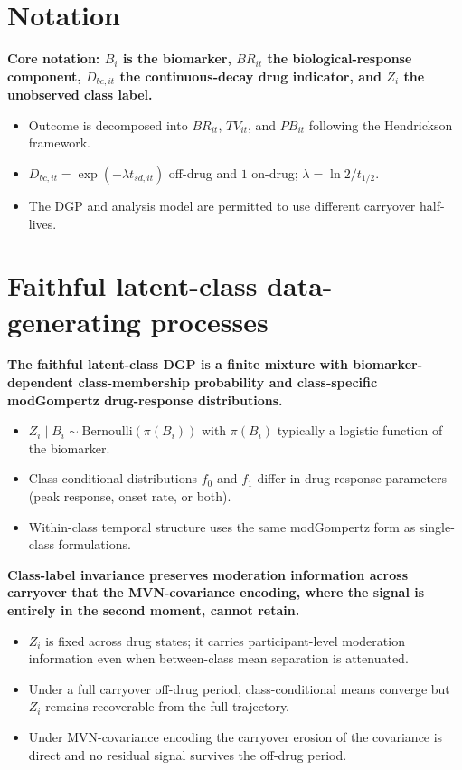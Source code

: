 \documentclass[
  11pt,
]{article}
\begin{document}
\section{Notation}\label{notation}

\textbf{Core notation: $B_i$ is the biomarker, $BR_{it}$ the
biological-response component, $D_{bc,it}$ the continuous-decay drug
indicator, and $Z_i$ the unobserved class label.}

\begin{itemize}\setlength{\itemsep}{2pt}\setlength{\parskip}{0pt}
\item Outcome is decomposed into $BR_{it}$, $TV_{it}$, and $PB_{it}$
  following the Hendrickson framework.
\item $D_{bc,it} = \exp(-\lambda t_{sd,it})$ off-drug and $1$ on-drug;
  $\lambda = \ln 2 / t_{1/2}$.
\item The DGP and analysis model are permitted to use different
  carryover half-lives.
\end{itemize}

\section{Faithful latent-class data-generating processes}\label{faithful-latent-class-data-generating-processes}

\textbf{The faithful latent-class DGP is a finite mixture with
biomarker-dependent class-membership probability and class-specific
modGompertz drug-response distributions.}

\begin{itemize}\setlength{\itemsep}{2pt}\setlength{\parskip}{0pt}
\item $Z_i \mid B_i \sim \mathrm{Bernoulli}(\pi(B_i))$ with
  $\pi(B_i)$ typically a logistic function of the biomarker.
\item Class-conditional distributions $f_0$ and $f_1$ differ in
  drug-response parameters (peak response, onset rate, or both).
\item Within-class temporal structure uses the same modGompertz form
  as single-class formulations.
\end{itemize}

\textbf{Class-label invariance preserves moderation information
across carryover that the MVN-covariance encoding, where the signal is
entirely in the second moment, cannot retain.}

\begin{itemize}\setlength{\itemsep}{2pt}\setlength{\parskip}{0pt}
\item $Z_i$ is fixed across drug states; it carries participant-level
  moderation information even when between-class mean separation is
  attenuated.
\item Under a full carryover off-drug period, class-conditional means
  converge
  but $Z_i$ remains recoverable from the full trajectory.
\item Under MVN-covariance encoding the carryover erosion of the
  covariance is direct and no residual signal survives the off-drug
  period.
\end{itemize}
\end{document}
